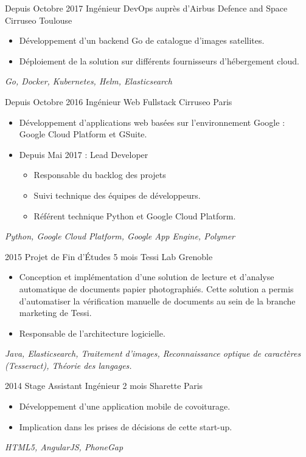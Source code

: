 \documentclass[11pt,a4paper,sans]{moderncv} %
\begin{document}
\cventry
    {Depuis Octobre 2017}
    {Ingénieur DevOps auprès d'Airbus Defence and Space}
    {}
    {Cirruseo}
    {Toulouse}
    {
        \begin{itemize}
            \item Développement d'un backend Go de catalogue d'images satellites.
            \item Déploiement de la solution sur différents fournisseurs d'hébergement cloud.
        \end{itemize}
        \textit{Go, Docker, Kubernetes, Helm, Elasticsearch}
    }
\vspace*{0.2cm}
\cventry
    {Depuis Octobre 2016}
    {Ingénieur Web Fullstack}
    {}
    {Cirruseo}
    {Paris}
    {
        \begin{itemize}
            \item Développement d'applications web basées sur l'environnement Google : Google Cloud Platform et GSuite.
            \item Depuis Mai 2017 : Lead Developer
            \begin{itemize}
                \item Responsable du backlog des projets
                \item Suivi technique des équipes de développeurs.
                \item Référent technique Python et Google Cloud Platform.
            \end{itemize}
        \end{itemize}
        \textit{Python, Google Cloud Platform, Google App Engine, Polymer}
    }
\vspace*{0.2cm}
\cventry
    {2015}
    {Projet de Fin d'Études}
    {5 mois}
    {Tessi Lab}
    {Grenoble}
    {
        \begin{itemize}
            \item Conception et implémentation d'une solution de lecture et d'analyse automatique de documents papier photographiés. Cette solution a permis d'automatiser la vérification manuelle de documents au sein de la branche marketing de Tessi.
            \item Responsable de l'architecture logicielle.
        \end{itemize}
        \vspace*{1mm}
        \textit{Java, Elasticsearch, Traitement d'images, Reconnaissance optique de caractères (Tesseract), Théorie des langages.}
    }
\vspace*{0.2cm}
\cventry
    {2014}
    {Stage Assistant Ingénieur}
    {2 mois}
    {Sharette}
    {Paris}
    {
        \begin{itemize}
            \item Développement d'une application mobile de covoiturage.
        \item Implication dans les prises de décisions de cette start-up.
        \end{itemize}
        \vspace*{1mm}
        \textit{HTML5, AngularJS, PhoneGap}
    }
\vspace*{0.2cm}
\end{document}
